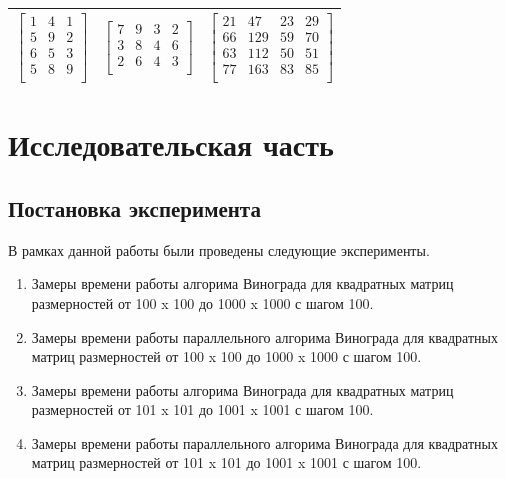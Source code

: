 \documentclass[a4paper,14pt]{report}
\begin{document}
\begin{table}[h!]
\begin{tabular}{|c | c | c |}
		$\begin{bmatrix}
		1 & 4 & 1 \\
		5 & 9 & 2 \\
		6 & 5 & 3 \\
		5 & 8 & 9 \\
		\end{bmatrix}$ &
		$\begin{bmatrix}
		7 & 9 & 3 & 2 \\
		3 & 8 & 4 & 6 \\
		2 & 6 & 4 & 3 \\
		\end{bmatrix}$ &
		$\begin{bmatrix}
		21 & 47 & 23 & 29 \\
		66 & 129 & 59 & 70 \\
		63 & 112 & 50 & 51 \\
		77 & 163 & 83 & 85 \\
		\end{bmatrix}$ \\
		\hline

		\end{tabular}
\end{table}

\chapter*{Исследовательская часть}

\section*{Постановка эксперимента}

В рамках данной работы были проведены следующие эксперименты.

\begin{enumerate}
	\item Замеры времени работы алгорима Винограда для квадратных матриц размерностей от 100 x 100 до 1000 x 1000 с шагом 100.
	\item Замеры времени работы параллельного алгорима Винограда для квадратных матриц размерностей от 100 x 100 до 1000 x 1000 с шагом 100.
	\item Замеры времени работы алгорима Винограда для квадратных матриц размерностей от 101 x 101 до 1001 x 1001 с шагом 100.
	\item Замеры времени работы параллельного алгорима Винограда для квадратных матриц размерностей от 101 x 101 до 1001 x 1001 с шагом 100.
\end{enumerate}
\end{document}
